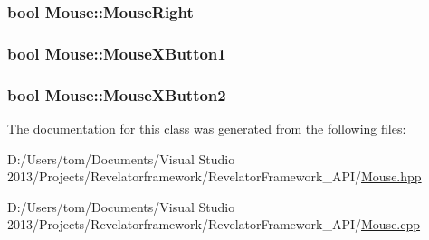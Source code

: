 \hypertarget{class_mouse_a0d7dd53605221594b161f9d8e61aa345}{
\subsubsection[{Mouse\-Right}]{\setlength{\rightskip}{0pt plus 5cm}bool Mouse\-::\-Mouse\-Right\hspace{0.3cm}{\ttfamily [private]}}}\label{class_mouse_a0d7dd53605221594b161f9d8e61aa345}
\hypertarget{class_mouse_af909f12e58b2b80528c5ca05d0452bda}{
\subsubsection[{Mouse\-X\-Button1}]{\setlength{\rightskip}{0pt plus 5cm}bool Mouse\-::\-Mouse\-X\-Button1\hspace{0.3cm}{\ttfamily [private]}}}\label{class_mouse_af909f12e58b2b80528c5ca05d0452bda}
\hypertarget{class_mouse_ade6dd013286bf4829948f8a69d9b7f8a}{
\subsubsection[{Mouse\-X\-Button2}]{\setlength{\rightskip}{0pt plus 5cm}bool Mouse\-::\-Mouse\-X\-Button2\hspace{0.3cm}{\ttfamily [private]}}}\label{class_mouse_ade6dd013286bf4829948f8a69d9b7f8a}


The documentation for this class was generated from the following files\-:\begin{DoxyCompactItemize}
\item 
D\-:/\-Users/tom/\-Documents/\-Visual Studio 2013/\-Projects/\-Revelatorframework/\-Revelator\-Framework\-\_\-\-A\-P\-I/\hyperlink{_mouse_8hpp}{Mouse.\-hpp}\item 
D\-:/\-Users/tom/\-Documents/\-Visual Studio 2013/\-Projects/\-Revelatorframework/\-Revelator\-Framework\-\_\-\-A\-P\-I/\hyperlink{_mouse_8cpp}{Mouse.\-cpp}\end{DoxyCompactItemize}
